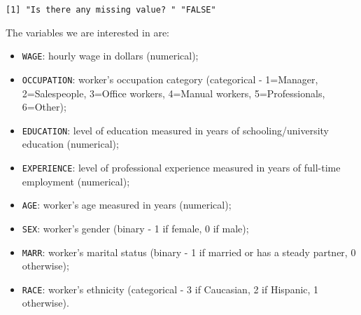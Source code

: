 \documentclass[
  letterpaper,
  DIV=11,
  numbers=noendperiod]{scrartcl}
\newenvironment{Shaded}{\begin{snugshade}}{\end{snugshade}}
\newcommand{\CommentTok}[1]{\textcolor[rgb]{0.37,0.37,0.37}{#1}}
\newcommand{\FunctionTok}[1]{\textcolor[rgb]{0.28,0.35,0.67}{#1}}
\newcommand{\NormalTok}[1]{\textcolor[rgb]{0.00,0.23,0.31}{#1}}
\newcommand{\OtherTok}[1]{\textcolor[rgb]{0.00,0.23,0.31}{#1}}
\newcommand{\SpecialCharTok}[1]{\textcolor[rgb]{0.37,0.37,0.37}{#1}}
\newcommand{\StringTok}[1]{\textcolor[rgb]{0.13,0.47,0.30}{#1}}
\begin{document}
\begin{Shaded}
\end{Shaded}

\begin{verbatim}
[1] "Is there any missing value? " "FALSE"                       
\end{verbatim}

The variables we are interested in are:

\begin{itemize}
\item
  \texttt{WAGE}: hourly wage in dollars (numerical);
\item
  \texttt{OCCUPATION}: worker's occupation category (categorical -
  1=Manager, 2=Salespeople, 3=Office workers, 4=Manual workers,
  5=Professionals, 6=Other);
\item
  \texttt{EDUCATION}: level of education measured in years of
  schooling/university education (numerical);
\item
  \texttt{EXPERIENCE}: level of professional experience measured in
  years of full-time employment (numerical);
\item
  \texttt{AGE}: worker's age measured in years (numerical);
\item
  \texttt{SEX}: worker's gender (binary - 1 if female, 0 if male);
\item
  \texttt{MARR}: worker's marital status (binary - 1 if married or has a
  steady partner, 0 otherwise);
\item
  \texttt{RACE}: worker's ethnicity (categorical - 3 if Caucasian, 2 if
  Hispanic, 1 otherwise).
\end{itemize}
\end{document}
